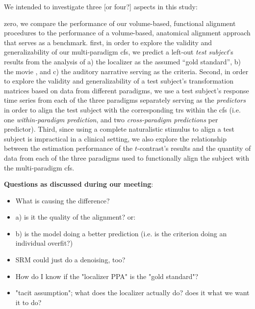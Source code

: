 

We intended to investigate three [or four?] aspects in this study:

zero, we compare the performance of our volume-based, functional alignment
procedures to the performance of a volume-based, anatomical alignment approach
that serves as a benchmark.
first, in order to explore the validity and generalizability of our
multi-paradigm \ac{cfs}, we predict a left-out \textit{test subject}'s results
from the analysis of
%
a) the localizer \citep{sengupta2016extension} as the assumed ``gold standard'',
%
b) the movie \citep{haeusler2022processing}, and
%
c) the auditory narrative \citep{haeusler2022processing}
%
serving as the criteria.
Second, in order to explore the validity and generalizability of a test
subject's transformation matrices based on data from different paradigms, we use
a test subject's response time series from each of the three paradigms
separately serving as the \textit{predictors} in order to align the test
subject with the corresponding \acp{tr} within the \ac{cfs} (i.e. one
\textit{within-paradigm prediction}, and two \textit{cross-paradigm predictions}
per predictor).
Third, since using a complete naturalistic stimulus to align a test subject is
impractical in a clinical setting, we also explore the relationship between the
estimation performance of the $t$-contrast's results and the quantity of data
from each of the three paradigms used to functionally align the subject with the
multi-paradigm \ac{cfs}.


\textbf{Questions as discussed during our meeting}:
\begin{itemize}

\item What is causing the difference?

\item a) is it the quality of the alignment? or:

\item b) is the model doing a better prediction
    (i.e. is the criterion doing an individual overfit?)

\item SRM could just do a denoising, too?

\item How do I know if the "localizer PPA" is the "gold standard"?

\item "tacit assumption"; what does the localizer actually do?
    does it what we want it to do?

\end{itemize}


